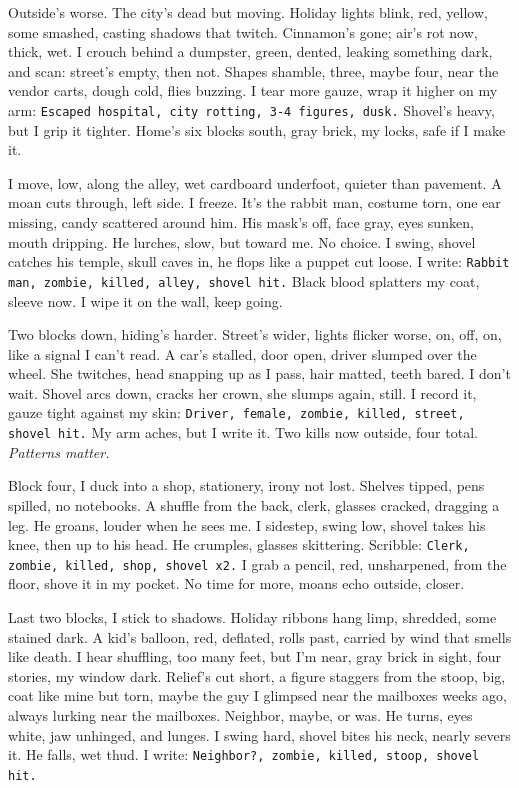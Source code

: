 \documentclass[12pt,oneside]{book}
\newcommand{\note}[1]{\texttt{#1}}
\begin{document}
Outside’s worse. The city’s dead but moving. Holiday lights blink, red, yellow, some smashed, casting shadows that twitch. Cinnamon’s gone; air’s rot now, thick, wet. I crouch behind a dumpster, green, dented, leaking something dark, and scan: street’s empty, then not. Shapes shamble, three, maybe four, near the vendor carts, dough cold, flies buzzing. I tear more gauze, wrap it higher on my arm: \note{Escaped hospital, city rotting, 3-4 figures, dusk.} Shovel’s heavy, but I grip it tighter. Home’s six blocks south, gray brick, my locks, safe if I make it.

I move, low, along the alley, wet cardboard underfoot, quieter than pavement. A moan cuts through, left side. I freeze. It’s the rabbit man, costume torn, one ear missing, candy scattered around him. His mask’s off, face gray, eyes sunken, mouth dripping. He lurches, slow, but toward me. No choice. I swing, shovel catches his temple, skull caves in, he flops like a puppet cut loose. I write: \note{Rabbit man, zombie, killed, alley, shovel hit.} Black blood splatters my coat, sleeve now. I wipe it on the wall, keep going.

Two blocks down, hiding’s harder. Street’s wider, lights flicker worse, on, off, on, like a signal I can’t read. A car’s stalled, door open, driver slumped over the wheel. She twitches, head snapping up as I pass, hair matted, teeth bared. I don’t wait. Shovel arcs down, cracks her crown, she slumps again, still. I record it, gauze tight against my skin: \note{Driver, female, zombie, killed, street, shovel hit.} My arm aches, but I write it. Two kills now outside, four total. \textit{Patterns matter.}

Block four, I duck into a shop, stationery, irony not lost. Shelves tipped, pens spilled, no notebooks. A shuffle from the back, clerk, glasses cracked, dragging a leg. He groans, louder when he sees me. I sidestep, swing low, shovel takes his knee, then up to his head. He crumples, glasses skittering. Scribble: \note{Clerk, zombie, killed, shop, shovel x2.} I grab a pencil, red, unsharpened, from the floor, shove it in my pocket. No time for more, moans echo outside, closer.

Last two blocks, I stick to shadows. Holiday ribbons hang limp, shredded, some stained dark. A kid’s balloon, red, deflated, rolls past, carried by wind that smells like death. I hear shuffling, too many feet, but I’m near, gray brick in sight, four stories, my window dark. Relief’s cut short, a figure staggers from the stoop, big, coat like mine but torn, maybe the guy I glimpsed near the mailboxes weeks ago, always lurking near the mailboxes. Neighbor, maybe, or was. He turns, eyes white, jaw unhinged, and lunges. I swing hard, shovel bites his neck, nearly severs it. He falls, wet thud. I write: \note{Neighbor?, zombie, killed, stoop, shovel hit.}
\end{document}
